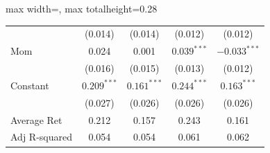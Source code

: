 \begin{table}[htbp]
{\begin{adjustbox}{max width=\linewidth, max totalheight=0.28\textheight}
\begin{tabular}{lcccc}
 & (0.014) & \phantom{$-$}(0.014) & (0.012) & (0.012) \\
Mom & \phantom{(}0.024\phantom{)} & \phantom{$-$(}0.001\phantom{)} & $0.039^{***}$ & $-0.033^{***}$ \\
 & (0.016) & \phantom{$-$}(0.015) & (0.013) & (0.012) \\
Constant & $0.209^{***}$ & $0.161^{***}$ & $0.244^{***}$ & $0.163^{***}$ \\
 & (0.027) & \phantom{$-$}(0.026) & (0.026) & (0.026) \\
Average Ret & \phantom{(}0.212\phantom{)} & \phantom{$-$(}0.157\phantom{)} & \phantom{(}0.243\phantom{)} & \phantom{(}0.161\phantom{)} \\
Adj R-squared & \phantom{(}0.054\phantom{)} & \phantom{$-$(}0.054\phantom{)} & \phantom{(}0.061\phantom{)} & \phantom{(}0.062\phantom{)} \\
\bottomrule
\end{tabular}
\end{adjustbox}
}
\end{table}
